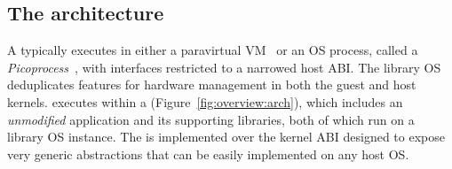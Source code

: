 \subsection{The architecture}
\label{sec:overview:libos:arch}

A \libos{} typically executes in either a paravirtual VM~\cite{unikernels,osv}
or an OS process, called a \emph{Picoprocess}~\cite{porter11drawbridge,baumann13bascule}, with interfaces restricted to a narrowed host ABI.
The library OS deduplicates features for hardware management in both the guest and host kernels.
\graphene{} executes within a \picoproc{} (Figure~\ref{fig:overview:arch}),
which includes an {\em unmodified} application and its supporting libraries, both of which run on a library OS instance.
The \libos{} is implemented over the kernel ABI designed to expose very generic abstractions that can be easily implemented on any host OS.


